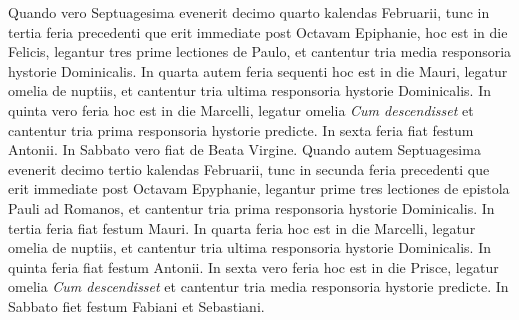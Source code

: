 \begin{multicols*}{2}
Quando vero Septuagesima evenerit decimo quarto kalendas Februarii, tunc in tertia feria precedenti que erit immediate post Octavam Epiphanie, hoc est in die Felicis, legantur tres prime lectiones de Paulo, et cantentur tria media responsoria hystorie Dominicalis. In quarta autem feria sequenti hoc est in die Mauri, legatur omelia de nuptiis, et cantentur tria ultima responsoria hystorie Dominicalis. In quinta vero feria hoc est in die Marcelli, legatur omelia \textit{Cum descendisset} et cantentur tria prima responsoria hystorie predicte. In sexta feria fiat festum Antonii. In Sabbato vero fiat de Beata Virgine.
Quando autem Septuagesima evenerit decimo tertio kalendas Februarii, tunc in secunda feria precedenti que erit immediate post Octavam Epyphanie, legantur prime tres lectiones de epistola Pauli ad Romanos, et cantentur tria prima responsoria hystorie Dominicalis. In tertia feria fiat festum Mauri. In quarta feria hoc est in die Marcelli, legatur omelia de nuptiis, et cantentur tria ultima responsoria hystorie Dominicalis. In quinta feria fiat festum Antonii. In sexta vero feria hoc est in die Prisce, legatur omelia \textit{Cum descendisset} et cantentur tria media responsoria hystorie predicte. In Sabbato fiet festum Fabiani et Sebastiani.




{\color{Red}}



\end{multicols*}
